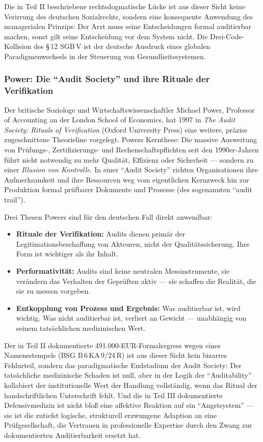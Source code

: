 \documentclass{umbruch-position}
\begin{document}
Die in Teil II beschriebene rechtsdogmatische Lücke ist aus dieser Sicht keine Verirrung des deutschen Sozialrechts, sondern eine konsequente Anwendung des managerialen Prinzips: Der Arzt muss seine Entscheidungen formal auditierbar machen, sonst gilt seine Entscheidung vor dem System nicht. Die Drei-Code-Kollision des \S\,12 SGB\,V ist der deutsche Ausdruck eines globalen Paradigmenwechsels in der Steuerung von Gesundheitssystemen.

\subsubsection{Power: Die ``Audit Society'' und ihre Rituale der Verifikation}

Der britische Soziologe und Wirtschaftswissenschaftler Michael Power, Professor of Accounting an der London School of Economics, hat 1997 in \textit{The Audit Society: Rituals of Verification} (Oxford University Press) eine weitere, präzise zugeschnittene Theorieline vorgelegt. Powers Kernthese: Die massive Ausweitung von Prüfungs-, Zertifizierungs- und Rechenschaftspflichten seit den 1990er-Jahren führt nicht notwendig zu mehr Qualität, Effizienz oder Sicherheit --- sondern zu einer \textit{Illusion von Kontrolle}. In einer ``Audit Society'' richten Organisationen ihre Aufmerksamkeit und ihre Ressourcen weg vom eigentlichen Kernzweck hin zur Produktion formal prüfbarer Dokumente und Prozesse (des sogenannten ``audit trail'').

Drei Thesen Powers sind für den deutschen Fall direkt anwendbar:

\begin{itemize}[nosep]
  \item \textbf{Rituale der Verifikation:} Audits dienen primär der Legitimationsbeschaffung von Akteuren, nicht der Qualitätssicherung. Ihre Form ist wichtiger als ihr Inhalt.
  \item \textbf{Performativität:} Audits sind keine neutralen Messinstrumente, sie verändern das Verhalten der Geprüften aktiv --- sie schaffen die Realität, die sie zu messen vorgeben.
  \item \textbf{Entkopplung von Prozess und Ergebnis:} Was auditierbar ist, wird wichtig. Was nicht auditierbar ist, verliert an Gewicht --- unabhängig von seinem tatsächlichen medizinischen Wert.
\end{itemize}

Der in Teil II dokumentierte 491.000-EUR-Formalregress wegen eines Namensstempels (BSG B\,6\,KA\,9/24\,R) ist aus dieser Sicht kein bizarres Fehlurteil, sondern das paradigmatische Endstadium der Audit Society: Der tatsächliche medizinische Schaden ist null, aber in der Logik der ``Auditability'' kollabiert der institutionelle Wert der Handlung vollständig, wenn das Ritual der handschriftlichen Unterschrift fehlt. Und die in Teil III dokumentierte Defensivmedizin ist nicht bloß eine affektive Reaktion auf ein ``Angstsystem'' --- sie ist die zutiefst logische, strukturell erzwungene Adaption an eine Prüfgesellschaft, die Vertrauen in professionelle Expertise durch den Zwang zur dokumentierten Auditierbarkeit ersetzt hat.
\end{document}
